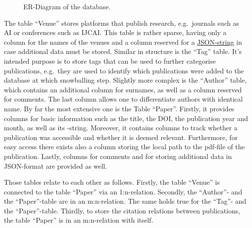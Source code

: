 \documentclass[11pt,a4paper]{book}
\theoremstyle{definition}
\theoremstyle{definition}
\theoremstyle{definition}
\theoremstyle{remark}
\begin{document}
\begin{figure}[h!]
\begin{center}
\end{center}
\caption{ER-Diagram of the database.}
\label{fig:er-diagram-publication-db}
\end{figure}



The table ``Venue'' stores platforms that publish research, e.g.\ journals such as AI or conferences such as IJCAI. This table is rather sparse, having only a column for the names of the venues and a column reserved for a \href{https://www.json.org/json-en.html}{JSON-string} in case additional data must be stored. 
Similar in structure is the ``Tag'' table. It's intended purpose is to store tags that can be used to further categorise publications, e.g.\ they are used to identify which publications were added to the database at which snowballing step.
Slightly more complex is the ``Author'' table, which contains an additional column for surnames, as well as a column reserved for comments. The last column allows one to differentiate authors with identical name. 
By far the most extensive one is the Table ``Paper''. 
Firstly, it provides columns for basic information such as the title, the DOI, the publication year and month, as well as its \BibTeX-string.
Moreover, it contains columns to track whether a publication was accessible and whether it is deemed relevant. 
Furthermore, for easy access there exists also a column storing the local path to the pdf-file of the publication.
Lastly, columns for comments and for storing additional data in JSON-format are provided as well.


Those tables relate to each other as follows. 
Firstly, the table ``Venue'' is connected to the table ``Paper'' via an 1:n-relation.
Secondly, the ``Author''- and the ``Paper''-table are in an m:n-relation. The same holds true for the ``Tag''- and the ``Paper''-table.
Thirdly, to store the citation relations between publications, the table ``Paper'' is in an m:n-relation with itself.
\end{document}
